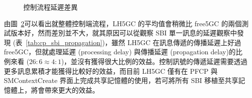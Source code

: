 \begin{figure}[htb]
\begin{subfigure}[b]{.5\linewidth}
        \caption[]{{\footnotesize}}
        \label{fig:cp_proc_ho}
    \end{subfigure}%
    \caption[控制流程延遲差異]{{\footnotesize 控制流程延遲差異}}
    \label{fig:cp_proc_comp}
\end{figure}

由圖~\ref{fig:cp_proc_comp}可以看出就整體控制端流程，LH5GC 的平均值會稍微比 free5GC 的兩個測試版本好，然而差別並不大，就其原因可以從觀察 SBI 單一訊息的延遲觀察中發現 (表~\ref{tab:cp_sbi_propagation})，雖然 LH5GC 在訊息傳遞的傳播延遲上好過 free5GC，但就處理延遲 (processing delay) 與傳播延遲 (propagation delay)的比例來看 ($26:6 \approx 4:1$)，並沒有獲得很大比例的效益。控制訊號的傳遞延遲需要透過更多訊息累積才能獲得比較好的效益，而目前 LH5GC 僅有在 PFCP 與 SMContextCreate 界面上完成共享記憶體的使用，若可將所有 SBI 移植至共享記憶體上，將會帶來更大的效益。
